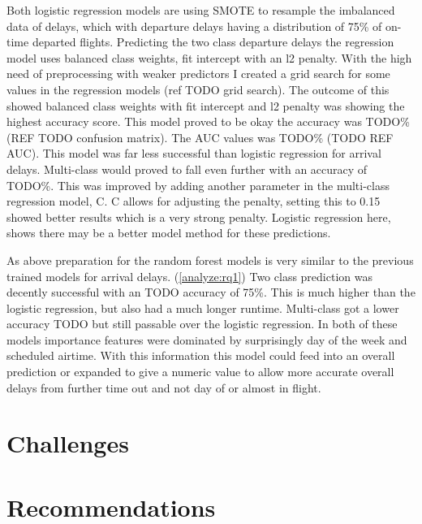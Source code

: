 \documentclass[a4paper,12pt]{article}
\begin{document}
Both logistic regression models are using SMOTE to resample the imbalanced data of delays, which with departure delays having a distribution of 
75\% of on-time departed flights. Predicting the two class departure delays the regression model uses balanced class weights, fit intercept with an l2 penalty.
With the high need of preprocessing with weaker predictors I created a grid search for some values in the regression models (ref TODO grid search).
The outcome of this showed balanced class weights with fit intercept and l2 penalty was showing the highest accuracy score. This model proved to be okay the accuracy was TODO\% (REF TODO confusion matrix).
The AUC values was TODO\% (TODO REF AUC). This model was far less successful than logistic regression for arrival delays. Multi-class would proved to fall even further with an accuracy of TODO\%.
This was improved by adding another parameter in the multi-class regression model, C. C allows for adjusting the penalty, setting this to 0.15 showed better results which is a very
strong penalty. Logistic regression here, shows there may be a better model method for these predictions.

As above preparation for the random forest models is very similar to the previous trained models for arrival delays. (\ref{analyze:rq1})
Two class prediction was decently successful with an TODO accuracy of 75\%. This is much higher than the logistic regression, but also had a much longer runtime.
Multi-class got a lower accuracy TODO but still passable over the logistic regression. In both of these models importance features were dominated by surprisingly day of the week 
and scheduled airtime. With this information this model could feed into an overall prediction or expanded to give a numeric value to allow more accurate overall delays from further time out and not 
day of or almost in flight.




\section{Challenges}



\section{Recommendations}
\end{document}
